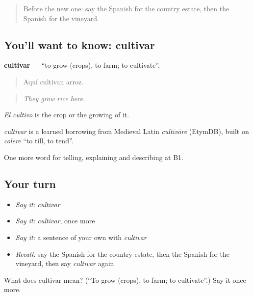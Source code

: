 \label{lesson:ES-C691-cultivar}



\begin{quote}
Before the new one: say the Spanish for the country estate, then the Spanish for the vineyard.
\end{quote}

\subsection*{You'll want to know: cultivar}
\textbf{cultivar} — \textquotedblleft{}to grow (crops), to farm; to cultivate\textquotedblright{}.

\begin{quote}
Aquí cultivan arroz.
\end{quote}

\begin{quote}
\emph{They grow rice here.}
\end{quote}

\emph{El cultivo} is the crop or the growing of it.

\begin{cousinweb}
\emph{cultivar} is a learned borrowing from Medieval Latin \emph{cultīvāre} (EtymDB), built on \emph{colere} \textquotedblleft{}to till, to tend\textquotedblright{}.
\end{cousinweb}

\begin{grammarlens}[title={What you've built}]
One more word for telling, explaining and describing at B1.
\end{grammarlens}

\subsection*{Your turn}
\begin{itemize}
\raggedright
  \item \emph{Say it:} \emph{cultivar}
  \item \emph{Say it:} \emph{cultivar}, once more
  \item \emph{Say it:} a sentence of your own with \emph{cultivar}
  \item \emph{Recall:} say the Spanish for the country estate, then the Spanish for the vineyard, then say \emph{cultivar} again
\end{itemize}

\begin{tcolorbox}[breakable,colback=teal!4,colframe=teal!35!black,title={Before you move on}]
What does cultivar mean? (\textquotedblleft{}To grow (crops), to farm; to cultivate\textquotedblright{}.) Say it once more.
\end{tcolorbox}
